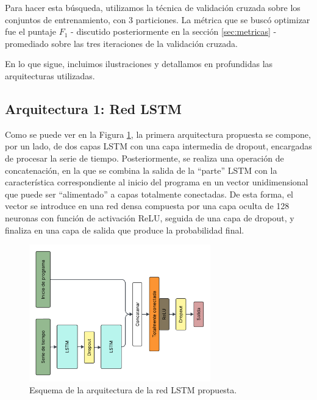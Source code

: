 \documentclass[../../main.tex]{subfiles}
\begin{document}
Para hacer esta búsqueda, utilizamos la técnica de validación cruzada sobre los conjuntos
de entrenamiento, con 3 particiones. La métrica que se buscó optimizar fue el puntaje
\(F_1\) - discutido posteriormente en la sección \ref{sec:metricas} - promediado sobre las
tres iteraciones de la validación cruzada.

En lo que sigue, incluimos ilustraciones y detallamos en profundidas las arquitecturas
utilizadas.

\subsection{Arquitectura 1: Red LSTM}
Como se puede ver en la Figura \ref{fig:lstm_v2}, la primera arquitectura propuesta se
compone, por un lado, de dos capas LSTM con una capa intermedia de dropout, encargadas de
procesar la serie de tiempo. Posteriormente, se realiza una operación de concatenación, en
la que se combina la salida de la ``parte'' LSTM con la característica correspondiente al
inicio del programa en un vector unidimensional que puede ser ``alimentado'' a capas
totalmente conectadas. De esta forma, el vector se introduce en una red densa compuesta
por una capa oculta de 128 neuronas con función de activación ReLU, seguida de una capa de
dropout, y finaliza en una capa de salida que produce la probabilidad final.
\begin{figure}[h]
    \centering
    \includegraphics[width=0.7\textwidth]{figs/lstm_v2.png}
    \caption{Esquema de la arquitectura de la red LSTM propuesta.}
    \label{fig:lstm_v2}
\end{figure}
\end{document}
